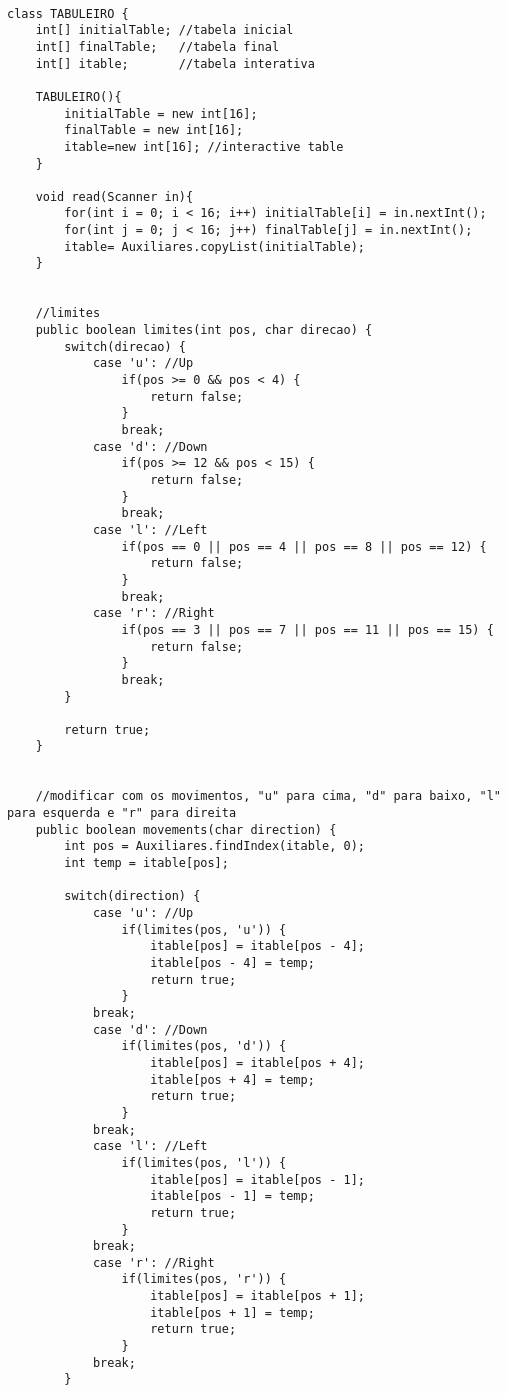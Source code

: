 \documentclass[12pt]{article}
\begin{document}
\paragraph{}
\begin{lstlisting}[frame=single]
class TABULEIRO {
    int[] initialTable; //tabela inicial
    int[] finalTable;   //tabela final
    int[] itable;       //tabela interativa

    TABULEIRO(){
        initialTable = new int[16];
        finalTable = new int[16];
        itable=new int[16]; //interactive table
    }

    void read(Scanner in){
        for(int i = 0; i < 16; i++) initialTable[i] = in.nextInt();
        for(int j = 0; j < 16; j++) finalTable[j] = in.nextInt();
        itable= Auxiliares.copyList(initialTable);
    }


    //limites
    public boolean limites(int pos, char direcao) {
        switch(direcao) {
            case 'u': //Up
                if(pos >= 0 && pos < 4) {
                    return false;
                }
                break;
            case 'd': //Down
                if(pos >= 12 && pos < 15) {
                    return false;
                }
                break;
            case 'l': //Left
                if(pos == 0 || pos == 4 || pos == 8 || pos == 12) {
                    return false;
                }
                break;
            case 'r': //Right
                if(pos == 3 || pos == 7 || pos == 11 || pos == 15) {
                    return false;
                }
                break;
        }

        return true;
    }

    
    //modificar com os movimentos, "u" para cima, "d" para baixo, "l" para esquerda e "r" para direita
    public boolean movements(char direction) {
        int pos = Auxiliares.findIndex(itable, 0);
        int temp = itable[pos];
        
        switch(direction) {
            case 'u': //Up
                if(limites(pos, 'u')) {
                    itable[pos] = itable[pos - 4];
                    itable[pos - 4] = temp;
                    return true;
                }
            break;
            case 'd': //Down
                if(limites(pos, 'd')) {
                    itable[pos] = itable[pos + 4];
                    itable[pos + 4] = temp;
                    return true;
                }
            break;
            case 'l': //Left
                if(limites(pos, 'l')) {
                    itable[pos] = itable[pos - 1];
                    itable[pos - 1] = temp;
                    return true;
                }
            break;
            case 'r': //Right
                if(limites(pos, 'r')) {
                    itable[pos] = itable[pos + 1];
                    itable[pos + 1] = temp;
                    return true;
                }
            break;
        }


\end{lstlisting}
\end{document}
